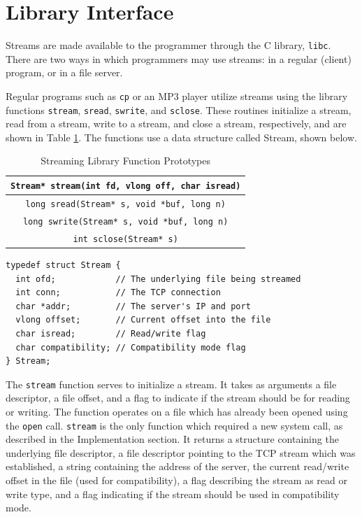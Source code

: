 \documentclass[11pt,american]{report}
\begin{document}
\section{Library Interface}

Streams are made available to the programmer through the C library, {\tt libc}. There are two ways in which programmers may use streams: in a regular (client) program, or in a file server.

Regular programs such as {\tt cp} or an MP3 player utilize streams using the library functions {\tt stream}, {\tt sread}, {\tt swrite}, and {\tt sclose}. These routines initialize a stream, read from a stream, write to a stream, and close a stream, respectively, and are shown in Table \ref{table:libfunc}. The functions use a data structure called Stream, shown below.

\begin{table}[h]
	\caption{Streaming Library Function Prototypes}
	\begin{center}
		\begin{tabular}{ | c | }
			\hline
			{\tt Stream* stream(int fd, vlong off, char isread)} \\ \hline
			{\tt long sread(Stream* s, void *buf, long n)} \\ \hline
			{\tt long swrite(Stream* s, void *buf, long n)} \\ \hline
			{\tt int sclose(Stream* s)} \\ \hline
		\end{tabular}
	\end{center}
	\label{table:libfunc}
\end{table}

\begin{program}
\begin{verbatim}
typedef struct Stream {
  int ofd;            // The underlying file being streamed
  int conn;           // The TCP connection
  char *addr;         // The server's IP and port
  vlong offset;       // Current offset into the file
  char isread;        // Read/write flag
  char compatibility; // Compatibility mode flag
} Stream;
\end{verbatim}
\caption{Stream data structure}
\end{program}

The {\tt stream} function serves to initialize a stream. It takes as arguments a file descriptor, a file offset, and a flag to indicate if the stream should be for reading or writing. The function operates on a file which has already been opened using the {\tt open} call. {\tt stream} is the only function which required a new system call, as described in the Implementation section. It returns a structure containing the underlying file descriptor, a file descriptor pointing to the TCP stream which was established, a string containing the address of the server, the current read/write offset in the file (used for compatibility), a flag describing the stream as read or write type, and a flag indicating if the stream should be used in compatibility mode.
\end{document}
